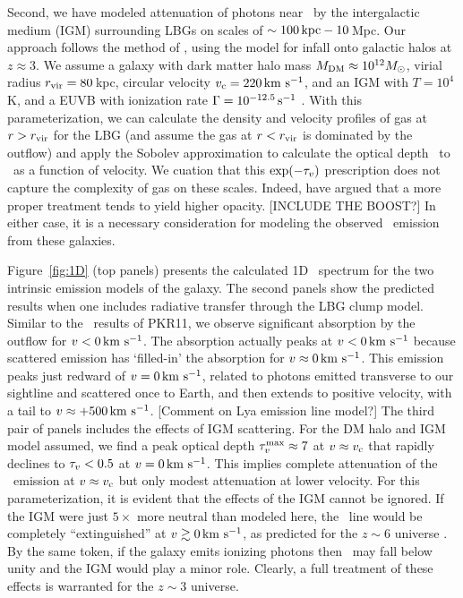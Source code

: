 \documentclass[12pt,preprint]{aastex}
\begin{document}
Second, we have modeled attenuation of photons near \lya\ by the
intergalactic medium (IGM) surrounding LBGs on scales of $\sim 100\,
{\rm kpc} - 10$\,Mpc.  Our approach follows the method of
\cite{santos04}, using the \cite{barkana04} model for infall onto
galactic halos at $z \approx 3$.  We assume a galaxy with dark matter
halo mass $M_{\rm DM} \approx 10^{12} M_\odot$, virial radius $r_{\rm vir} 
= 80$\,kpc, circular velocity $v_{\rm c} = 220 \, {\rm km~s^{-1}}$, and an
IGM with $T = 10^4$\,K, and a EUVB with ionization rate $\Gamma =
10^{-12.5} \, \rm s^{-1}$ \citep{fpl+08}.  With this parameterization,
we can calculate the density and velocity profiles of gas at $r >
r_{\rm vir}$ for the LBG (and assume the gas at $r<r_{\rm vir}$ is dominated by
the outflow) and apply the Sobolev approximation to calculate the
optical depth \tauv\ to \lya\ as a function of velocity.  We cuation that
this $\exp(-\tau_v)$ prescription does not capture the complexity of
gas on these scales.  Indeed, \cite{zheng10a} have argued that a more
proper treatment tends to yield higher opacity.
[INCLUDE THE BOOST?]
In either case, it is a necessary consideration for modeling the
observed \lya\ emission from these galaxies.

Figure~\ref{fig:1D} (top panels) presents the 
calculated 1D \lya\ spectrum for the
two intrinsic emission models of the galaxy.
The second panels show the predicted results when one includes
radiative transfer through the LBG clump model.  Similar to the \mgii\
results of PKR11, we observe significant absorption by the outflow for
$v < 0\, {\rm km~s^{-1}}$.  The absorption actually peaks at $v < 0\, {\rm km~s^{-1}}$ because
scattered emission has `filled-in' the absorption for $v \approx 0
\, {\rm km~s^{-1}}$.  This emission peaks just redward of $v=0\, {\rm km~s^{-1}}$, related to
photons emitted transverse to our sightline and scattered once to
Earth, and then extends to positive velocity, with a tail to $v
\approx +500\, {\rm km~s^{-1}}$.  [Comment on Lya emission line model?]
The third pair of panels includes the effects of IGM scattering.  For
the DM halo and IGM model assumed, we find a peak optical depth
$\tau_v^{\rm max} \approx 7$ at $v \approx v_{\rm c}$ that rapidly declines to
$\tau_v < 0.5$ at $v=0\, {\rm km~s^{-1}}$.  This implies complete attenuation of
the \lya\ emission at $v \approx v_{\rm c}$ but only modest
attenuation at lower velocity.  For this parameterization, it is evident that
the effects of the IGM cannot be ignored.  If the IGM were just $5
\times$ more neutral than modeled here, the \lya\ line would be
completely ``extinguished'' at $v \gtrsim 0 \, {\rm km~s^{-1}}$, as predicted for
the $z \sim 6$ universe \citep{zheng+10a}.  By the same token, if the
galaxy emits ionizing photons then \tmax\ may fall below unity and the
IGM would play a minor role.  Clearly, a full treatment of these
effects is warranted for the $z \sim 3$ universe.
\end{document}
